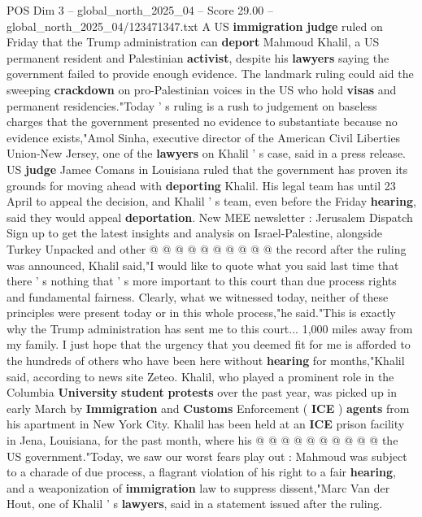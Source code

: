 \begin{textsample}{POS Dim 3 – global\_north\_2025\_04 – Score 29.00 – global\_north\_2025\_04/123471347.txt}  \label{ex:f3_pos_045}
A US \textbf{immigration} \textbf{judge} ruled on Friday that the Trump administration can \textbf{deport} Mahmoud Khalil, a US permanent resident and Palestinian \textbf{activist}, despite his \textbf{lawyers} saying the government failed to provide enough evidence.
The landmark ruling could aid the sweeping \textbf{crackdown} on pro-Palestinian voices in the US who hold \textbf{visas} and permanent residencies."Today ' s ruling is a rush to judgement on baseless charges that the government presented no evidence to substantiate because no evidence exists,"Amol Sinha, executive director of the American Civil Liberties Union-New Jersey, one of the \textbf{lawyers} on Khalil ' s case, said in a press release.
US \textbf{judge} Jamee Comans in Louisiana ruled that the government has proven its grounds for moving ahead with \textbf{deporting} Khalil.
His legal team has until 23 April to appeal the decision, and Khalil ' s team, even before the Friday \textbf{hearing}, said they would appeal \textbf{deportation}.
New MEE newsletter : Jerusalem Dispatch Sign up to get the latest insights and analysis on Israel-Palestine, alongside Turkey Unpacked and other @ @ @ @ @ @ @ @ @ @ the record after the ruling was announced, Khalil said,"I would like to quote what you said last time that there ' s nothing that ' s more important to this court than due process rights and fundamental fairness.
Clearly, what we witnessed today, neither of these principles were present today or in this whole process,"he said."This is exactly why the Trump administration has sent me to this court... 1,000 miles away from my family.
I just hope that the urgency that you deemed fit for me is afforded to the hundreds of others who have been here without \textbf{hearing} for months,"Khalil said, according to news site Zeteo.
Khalil, who played a prominent role in the Columbia \textbf{University} \textbf{student} \textbf{protests} over the past year, was picked up in early March by \textbf{Immigration} and \textbf{Customs} Enforcement ( \textbf{ICE} ) \textbf{agents} from his apartment in New York City.
Khalil has been held at an \textbf{ICE} prison facility in Jena, Louisiana, for the past month, where his @ @ @ @ @ @ @ @ @ @ the US government."Today, we saw our worst fears play out : Mahmoud was subject to a charade of due process, a flagrant violation of his right to a fair \textbf{hearing}, and a weaponization of \textbf{immigration} law to suppress dissent,"Marc Van der Hout, one of Khalil ' s \textbf{lawyers}, said in a statement issued after the ruling.

\end{textsample}
